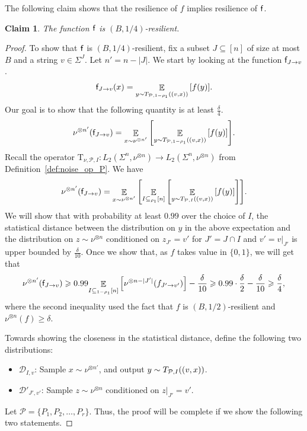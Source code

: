 \documentclass[10pt,a4paper]{amsart}
\newtheorem{claim}[thm]{Claim}
\newcommand\Expect[2]{{\mathop{\mathbb{E}}_{#1}\left[ {#2} \right]}}
\renewcommand\geq{\geqslant}
\begin{document}
The following claim shows that the resilience of $f$ implies resilience of $\mathsf{f}$.
\begin{claim}
\label{claim:f_to_noisyf_resilience}
The function $\mathsf{f}$ is $(B, 1/4)$-resilient.
\end{claim}
\begin{proof}
To show that $\mathsf{f}$ is $(B, 1/4)$-resilient, fix a subset $J \subseteq [n]$ of size at most $B$ and a string $v\in \Sigma^{J}$. Let $n' = n-|J|$.
We start by looking at the function $\mathsf{f}_{J\rightarrow v}$.
\[
\noisyfcoarse_{J\rightarrow v} (x) = \Expect{y\sim {\rm T}_{\mathcal{P}, 1-\rho_1} ((v, x))}{f(y)}.
\]
Our goal is to show that the following quantity is at least $ \frac{\delta}{4}$.
\[
\nu^{\otimes n'}(\noisyfcoarse_{J\rightarrow v} ) = \Expect{x\sim \nu^{\otimes n'}}{\Expect{y\sim {\rm T}_{\mathcal{P}, 1-\rho_1} ((v, x))}{f(y)}}.
\]
Recall the operator $\mathrm{T}_{\nu, \mathcal{P}, I} \colon L_2(\Sigma^n,\nu^{\otimes n})\to L_2(\Sigma^n,\nu^{\otimes n})$ from Definition~\ref{def:noise_op_P}. 
We have
\[
\nu^{\otimes n'}(\noisyfcoarse_{J\rightarrow v} ) = \Expect{x\sim \nu^{\otimes n'}}{\Expect{I\subseteq_{\rho_1}[n]}{\Expect{y\sim {\rm T}_{\mathcal{P},I} ((v, x))}{f(y)}}} .
\]
We will show that with probability at least $0.99$ over the choice of $I$, the statistical distance between the distribution on $y$ in the above expectation and the distribution on $z\sim \nu^{\otimes n}$ conditioned on $z_{J'} =  v'$ for $J' = J\cap I$ and $v' = v|_{J'}$  is upper bounded by $\frac{\delta}{10}$. Once we show that, as $f$ takes value in $\{0, 1\}$, we will get that
\[
\nu^{\otimes n'}(\noisyfcoarse_{J\rightarrow v} )  \geq 0.99\Expect{I\subseteq_{1-\rho_1} [n]}{\nu^{\otimes n-|J'|}(f_{J'\rightarrow v'})} - \frac{\delta}{10}\geq 0.99\cdot \frac{\delta}{2} - \frac{\delta}{10} \geq \frac{\delta}{4},
\]
where the second inequality used the fact that $f$ is $(B, 1/2)$-resilient and $\nu^{\otimes n}(f) \geq \delta$.

Towards showing the closeness in the statistical distance, define the following two distributions:
\begin{itemize}
    \item $\mathcal{D}_{I,v}$: Sample $x\sim \nu^{\otimes n'}$, and output $y\sim {\rm T}_{\mathcal{P},I} ((v, x))$. 
    \item $\mathcal{D}'_{J', v'}$: Sample $z\sim \nu^{\otimes n}$ conditioned on $z|_{J'} = v'$. 
\end{itemize}
Let $\mathcal{P} = \{P_1, P_2, \ldots, P_r\}$. 
Thus, the proof will be complete if we show the following two statements. 


\end{proof}
\end{document}

